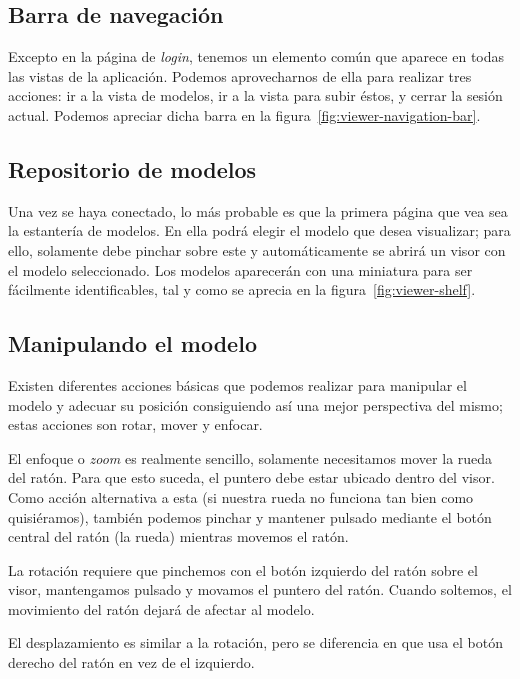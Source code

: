 \subsection{Barra de navegación}
Excepto en la página de \textit{login}, tenemos un elemento común que aparece en todas las vistas de la aplicación. Podemos aprovecharnos de ella para realizar tres acciones: ir a la vista de modelos, ir a la vista para subir éstos, y cerrar la sesión actual. Podemos apreciar dicha barra en la figura~\ref{fig:viewer-navigation-bar}.

\subsection{Repositorio de modelos}
Una vez se haya conectado, lo más probable es que la primera página que vea sea la estantería de modelos. En ella podrá elegir el modelo que desea visualizar; para ello, solamente debe pinchar sobre este y automáticamente se abrirá un visor con el modelo seleccionado. Los modelos aparecerán con una miniatura para ser fácilmente identificables, tal y como se aprecia en la figura~\ref{fig:viewer-shelf}.

\subsection{Manipulando el modelo}
Existen diferentes acciones básicas que podemos realizar para manipular el modelo y adecuar su posición consiguiendo así una mejor perspectiva del mismo; estas acciones son rotar, mover y enfocar.

El enfoque o \textit{zoom} es realmente sencillo, solamente necesitamos mover la rueda del ratón. Para que esto suceda, el puntero debe estar ubicado dentro del visor. Como acción alternativa a esta (si nuestra rueda no funciona tan bien como quisiéramos), también podemos pinchar y mantener pulsado mediante el botón central del ratón (la rueda) mientras movemos el ratón.

La rotación requiere que pinchemos con el botón izquierdo del ratón sobre el visor, mantengamos pulsado y movamos el puntero del ratón. Cuando soltemos, el movimiento del ratón dejará de afectar al modelo.

El desplazamiento es similar a la rotación, pero se diferencia en que usa el botón derecho del ratón en vez de el izquierdo.


